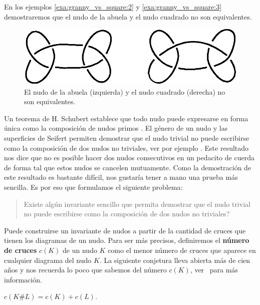 \documentclass[graybox]{svmult}
\begin{document}
En los ejemplos \ref{exa:granny_vs_square:2} y \ref{exa:granny_vs_square:3}
demostraremos que el nudo de la abuela y el nudo cuadrado no son equivalentes.

\begin{figure}[ht]
	\centering
	\includegraphics[scale=0.6]{images/grannyandsquare}
	\caption{El nudo de la abuela (izquierda) y el nudo cuadrado (derecha)
	no son equivalentes.}
	\label{fig:granny_and_square}
\end{figure}

Un teorema de H. Schubert establece que todo nudo puede expresarse en forma
única como la composición de nudos primos \cite[VII]{MR3156509}.  El género de
un nudo y las superficies de Seifert permiten demostrar que el nudo trivial no
puede escribirse como la composición de dos nudos no triviales, ver por ejemplo
\cite[\S4.3]{MR2079925}. Este resultado nos dice que no es posible hacer dos
nudos consecutivos en un pedacito de cuerda de forma tal que estos nudos se
cancelen mutuamente.  Como la demostración de este resultado es bastante
difícil, nos gustaría tener a mano una prueba más sencilla. Es por eso que
formulamos el siguiente problema:
\begin{quote}
	\textquestiondown Existe algún invariante sencillo que permita
	demostrar que el nudo trivial no puede escribirse como la composición
	de dos nudos no triviales? 
\end{quote}

Puede construirse un invariante de nudos a partir de la cantidad de cruces que
tienen los diagramas de un nudo.  Para ser más precisos, definiremos el
\textbf{número de cruces} $c(K)$ de un nudo $K$ como el menor número de cruces
que aparece en cualquier diagrama del nudo $K$. La siguiente conjetura lleva
abierta más de cien años y nos recuerda lo poco que sabemos del número $c(K)$,
ver~\cite[\S 3.3]{MR2079925} para más información.

\begin{conjecture}
	$c(K\#L)=c(K)+c(L)$. 
\end{conjecture}
\end{document}
